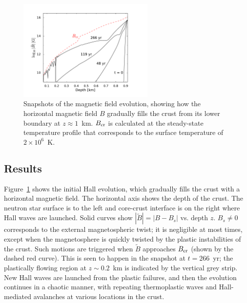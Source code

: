 \begin{figure}[htbp]
\centering
\includegraphics[width=0.6\textwidth]{pics/chap2/fig2.pdf} 
\caption[Snapshots of
the magnetic field evolution]{Snapshots of the magnetic field evolution, showing how the horizontal magnetic field $B$ gradually fills the crust from its lower boundary at $z\approx 1$~km. 
$B_{\rm cr}$ is calculated at the steady-state temperature profile that corresponds to the surface temperature of $2\times 10^{6}$~K.}
\label{fig2}
\end{figure}

\subsection{Results}


Figure~\ref{fig2} shows the initial Hall evolution, which gradually fills the crust with a horizontal magnetic field. 
The horizontal axis shows the depth of the crust. The neutron star surface is to the left and core-crust interface is on the right where Hall waves are launched.
Solid curves show $|\tilde{B}|=|B-B_s|$ vs. depth $z$. 
$B_s\neq 0$ corresponds to the external magnetospheric twist; it is negligible at most times, except when the magnetosphere is quickly twisted by the plastic 
instabilities of the crust. 
Such motions are triggered when $\tilde{B}$ approaches $B_{\rm cr}$ (shown by the dashed red curve). 
This is seen to happen in the snapshot at $t=266$~yr; the plastically flowing region at $z\sim 0.2$~km is indicated by the vertical grey strip.
New Hall waves are launched from the plastic failures, and then the evolution continues in a chaotic manner, with repeating thermoplastic waves and Hall-mediated avalanches at various locations in the crust.

